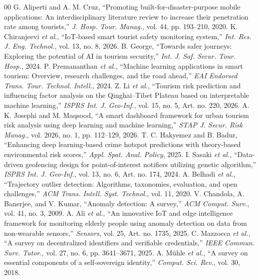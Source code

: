 \documentclass[conference]{IEEEtran}
\begin{document}
\begin{thebibliography}{00}
 G. Aliperti and A. M. Cruz, ``Promoting built-for-disaster-purpose mobile applications: An interdisciplinary literature review to increase their penetration rate among tourists,'' \textit{J. Hosp. Tour. Manag.}, vol. 44, pp. 193--210, 2020.
 K. Chiranjeevi \textit{et al.}, ``IoT-based smart tourist safety monitoring system,'' \textit{Int. Res. J. Eng. Technol.}, vol. 13, no. 8, 2026.
 B. George, ``Towards safer journeys: Exploring the potential of AI in tourism security,'' \textit{Int. J. Saf. Secur. Tour. Hosp.}, 2024.
 P. Premananthan \textit{et al.}, ``Machine learning applications in smart tourism: Overview, research challenges, and the road ahead,'' \textit{EAI Endorsed Trans. Tour. Technol. Intell.}, 2024.
 Z. Li \textit{et al.}, ``Tourism risk prediction and influencing factor analysis on the Qinghai--Tibet Plateau based on interpretable machine learning,'' \textit{ISPRS Int. J. Geo-Inf.}, vol. 15, no. 5, Art. no. 220, 2026.
 A. K. Josephi and M. Maqsood, ``A smart dashboard framework for urban tourism risk analysis using deep learning and machine learning,'' \textit{STAP J. Secur. Risk Manag.}, vol. 2026, no. 1, pp. 112--129, 2026.
 T. C. Hakyemez and B. Badur, ``Enhancing deep learning-based crime hotspot predictions with theory-based environmental risk scores,'' \textit{Appl. Spat. Anal. Policy}, 2025.
 I. Sasaki \textit{et al.}, ``Data-driven geofencing design for point-of-interest notifiers utilizing genetic algorithm,'' \textit{ISPRS Int. J. Geo-Inf.}, vol. 13, no. 6, Art. no. 174, 2024.
 A. Belhadi \textit{et al.}, ``Trajectory outlier detection: Algorithms, taxonomies, evaluation, and open challenges,'' \textit{ACM Trans. Intell. Syst. Technol.}, vol. 11, 2020.
 V. Chandola, A. Banerjee, and V. Kumar, ``Anomaly detection: A survey,'' \textit{ACM Comput. Surv.}, vol. 41, no. 3, 2009.
 A. Ali \textit{et al.}, ``An innovative IoT and edge intelligence framework for monitoring elderly people using anomaly detection on data from non-wearable sensors,'' \textit{Sensors}, vol. 25, Art. no. 1735, 2025.
 C. Mazzocca \textit{et al.}, ``A survey on decentralized identifiers and verifiable credentials,'' \textit{IEEE Commun. Surv. Tutor.}, vol. 27, no. 6, pp. 3641--3671, 2025.
 A. M\"uhle \textit{et al.}, ``A survey on essential components of a self-sovereign identity,'' \textit{Comput. Sci. Rev.}, vol. 30, 2018.

\end{thebibliography}
\end{document}
